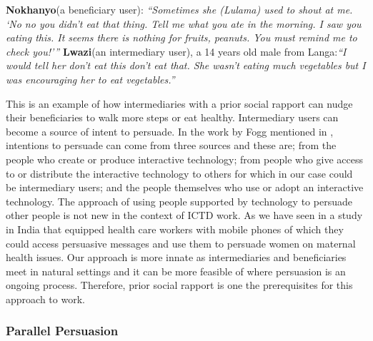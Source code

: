 \documentclass{sig-alternate}
\begin{document}
\textbf{Nokhanyo}(a beneficiary user): \textit{``Sometimes she (Lulama) 
used to shout at me. `No no you didn't eat that thing. Tell me what you 
ate in the morning. I saw you eating this. It seems there is nothing for 
fruits, peanuts. You must remind me to check you!'''}
\textbf{Lwazi}(an intermediary user), a 14 years old male from 
Langa:\textit{``I would tell her don't eat this don't eat that. She wasn't 
eating much vegetables but I was encouraging her to eat vegetables.''}

This is an example of how intermediaries with a prior social rapport can nudge
their beneficiaries to walk more steps or eat healthy. Intermediary users can
become a source of intent to persuade. In the work by Fogg
\cite{fogg1998persuasive} mentioned in \cite{Oinas-kukkonen:psd}, intentions
to persuade can come from three sources and these are; from the people who
create or produce interactive technology; from people who give access to or
distribute the interactive technology to others for which in our case could be
intermediary users; and the people themselves who use or adopt an interactive
technology. The approach of using people supported by technology to persuade
other people is not new in the context of ICTD work. As we have seen in a
study in India that equipped health care workers with mobile phones of which
they could access persuasive messages and use them to persuade women on
maternal health issues\cite{ramachandran2010mobile,ramachandran2010research}.
Our approach is more innate as intermediaries and beneficiaries meet in
natural settings and it can be more feasible of where persuasion is an ongoing
process. Therefore, prior social rapport is one the prerequisites for this
approach to work.


\subsubsection*{\textbf{Parallel Persuasion}} 
\end{document}
